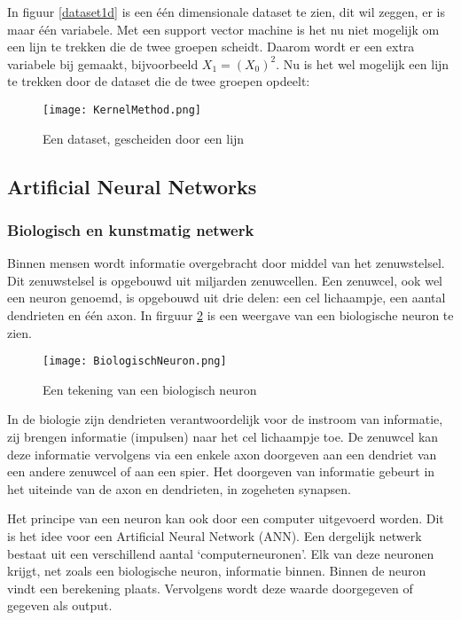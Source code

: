 In figuur \ref{dataset1d} is een één dimensionale dataset te zien, dit wil zeggen, er is maar één variabele. Met een support vector machine is het nu niet mogelijk om een lijn te trekken die de twee groepen scheidt. Daarom wordt er een extra variabele bij gemaakt, bijvoorbeeld $X_{1} = (X_{0})^{2}$. Nu is het wel mogelijk een lijn te trekken door de dataset die de twee groepen opdeelt:

\begin{figure}[h]
  \centering
    \texttt{[image: KernelMethod.png]}
  \caption{Een dataset, gescheiden door een lijn}
  \label{fig:SupVectorMachine1}
\end{figure}

\subsection{Artificial Neural Networks}
\subsubsection{Biologisch en kunstmatig netwerk}
Binnen mensen wordt informatie overgebracht door middel van het zenuwstelsel. Dit zenuwstelsel is opgebouwd uit miljarden zenuwcellen. Een zenuwcel, ook wel een neuron genoemd, is opgebouwd uit drie delen: een cel lichaampje, een aantal dendrieten en één axon. In firguur \ref{fig:BiologischNeuron} is een weergave van een biologische neuron te zien.

\begin{figure}[h]
  \centering
    \texttt{[image: BiologischNeuron.png]}
  \caption{Een tekening van een biologisch neuron}
  \label{fig:BiologischNeuron}
\end{figure}

In de biologie zijn dendrieten verantwoordelijk voor de instroom van informatie, zij brengen informatie (impulsen) naar het cel lichaampje toe. De zenuwcel kan deze informatie vervolgens via een enkele axon doorgeven aan een dendriet van een andere zenuwcel of aan een spier. Het doorgeven van informatie gebeurt in het uiteinde van de axon en dendrieten, in zogeheten synapsen.

Het principe van een neuron kan ook door een computer uitgevoerd worden. Dit is het idee voor een Artificial Neural Network (ANN). Een dergelijk netwerk bestaat uit een verschillend aantal ‘computerneuronen’. Elk van deze neuronen krijgt, net zoals een biologische neuron, informatie binnen. Binnen de neuron vindt een berekening plaats. Vervolgens wordt deze waarde doorgegeven of gegeven als output.

